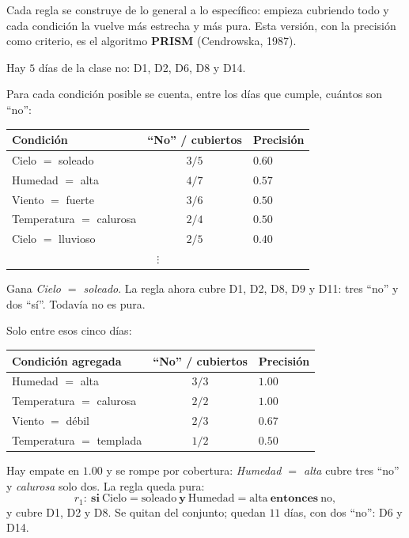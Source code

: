\documentclass[11pt,letterpaper]{article}
\begin{document}
Cada regla se construye de lo general a lo específico: empieza
cubriendo todo y cada condición la vuelve más estrecha y más pura. Esta
versión, con la precisión como criterio, es el algoritmo
\textbf{PRISM} (Cendrowska, 1987).

\begin{ejemplo}
    Hay $5$ días de la clase no: D1, D2, D6, D8 y D14.

     Para cada condición posible se
    cuenta, entre los días que cumple, cuántos son ``no'':
    \begin{center}
    \small
    \begin{tabular}{lcl}
        \toprule
        \textbf{Condición} & \textbf{``No'' / cubiertos}
        & \textbf{Precisión} \\
        \midrule
        Cielo $=$ soleado & $3/5$ & $0.60$ \\
        Humedad $=$ alta & $4/7$ & $0.57$ \\
        Viento $=$ fuerte & $3/6$ & $0.50$ \\
        Temperatura $=$ calurosa & $2/4$ & $0.50$ \\
        Cielo $=$ lluvioso & $2/5$ & $0.40$ \\
        \multicolumn{3}{c}{$\vdots$} \\
        \bottomrule
    \end{tabular}
    \end{center}
    Gana \textit{Cielo $=$ soleado}. La regla ahora cubre D1, D2, D8,
    D9 y D11: tres ``no'' y dos ``sí''. Todavía no es pura.

     Solo entre esos cinco días:
    \begin{center}
    \small
    \begin{tabular}{lcl}
        \toprule
        \textbf{Condición agregada} & \textbf{``No'' / cubiertos}
        & \textbf{Precisión} \\
        \midrule
        Humedad $=$ alta & $3/3$ & $1.00$ \\
        Temperatura $=$ calurosa & $2/2$ & $1.00$ \\
        Viento $=$ débil & $2/3$ & $0.67$ \\
        Temperatura $=$ templada & $1/2$ & $0.50$ \\
        \bottomrule
    \end{tabular}
    \end{center}
    Hay empate en $1.00$ y se rompe por cobertura: \textit{Humedad $=$
    alta} cubre tres ``no'' y \textit{calurosa} solo dos. La regla
    queda pura:
    \[
        r_1: \ \textbf{si}\ \text{Cielo} = \text{soleado}\ \textbf{y}\
        \text{Humedad} = \text{alta}\ \textbf{entonces}\ \text{no} ,
    \]
    y cubre D1, D2 y D8. Se quitan del conjunto; quedan $11$ días, con
    dos ``no'': D6 y D14.


\end{ejemplo}
\end{document}
